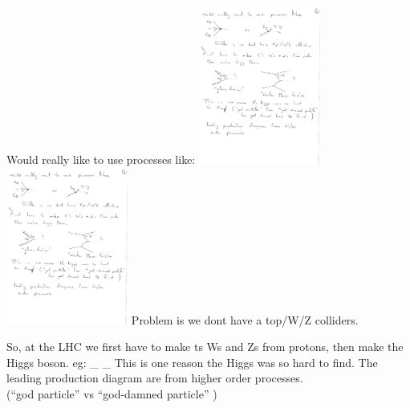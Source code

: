 {Would really like to use processes like:
\bc
\includegraphics[width=0.3\textwidth]{./ttH.pdf}
\hspace*{0.5in}
\includegraphics[width=0.3\textwidth]{./VVH.pdf}
\ec
Problem is we dont have a top/W/Z colliders.

So, at the LHC we first have to make ts Ws and Zs from protons, then make the Higgs boson.
eg: 
\be
{}_{}
\hspace*{0.2in}
_{}
\ee
This is one reason the Higgs was so hard to find. 
The leading production diagram are from higher order processes.\\
(``god particle'' vs ``god-damned particle'' )

}
